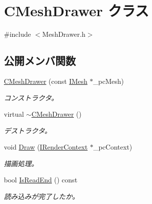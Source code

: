 \hypertarget{class_c_mesh_drawer}{}\section{C\+Mesh\+Drawer クラス}
\label{class_c_mesh_drawer}


{\ttfamily \#include $<$Mesh\+Drawer.\+h$>$}

\subsection*{公開メンバ関数}
\begin{DoxyCompactItemize}
\item 
\hyperlink{class_c_mesh_drawer_a10d0f7891d2a54904ed3078708029ba4}{C\+Mesh\+Drawer} (const \hyperlink{class_i_mesh}{I\+Mesh} $\ast$\+\_\+pc\+Mesh)
\begin{DoxyCompactList}\small\item\em コンストラクタ。 \end{DoxyCompactList}\item 
virtual \hyperlink{class_c_mesh_drawer_a806a4c666e00bfd72066ac1b405db2a1}{$\sim$\+C\+Mesh\+Drawer} ()
\begin{DoxyCompactList}\small\item\em デストラクタ。 \end{DoxyCompactList}\item 
void \hyperlink{class_c_mesh_drawer_a82ac2291582f714a5af0300526f4f107}{Draw} (\hyperlink{class_i_render_context}{I\+Render\+Context} $\ast$\+\_\+pc\+Context)
\begin{DoxyCompactList}\small\item\em 描画処理。 \end{DoxyCompactList}\item 
bool \hyperlink{class_c_mesh_drawer_aa342de95f105b4f22c75367b344df335}{Is\+Read\+End} () const 
\begin{DoxyCompactList}\small\item\em 読み込みが完了したか。 \end{DoxyCompactList}\end{DoxyCompactItemize}
